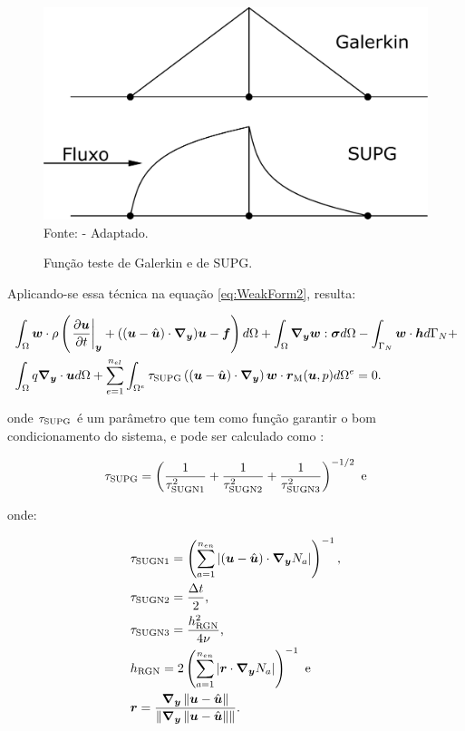 \begin{figure}[h!]
    \centering
    \caption{Função teste de Galerkin e de SUPG.}
    \includegraphics[width=.6\linewidth]{Figuras/SUPG.pdf}
    \\Fonte:  - Adaptado.
    \label{fig:Supg}
\end{figure}

Aplicando-se essa técnica na equação \eqref{eq:WeakForm2}, resulta:

\begin{equation}
    \begin{split}
        &\int_{\Omega}{\boldsymbol{w}\cdot\rho\left({\left.\frac{\partial \boldsymbol{u}}{\partial t}\right|_{\boldsymbol{y}}+((\boldsymbol{u}-\hat{\boldsymbol{u}})\cdot\boldsymbol{\nabla_y})\boldsymbol{u}-\boldsymbol{f}}\right) d\Omega}+\int_{\Omega}{\boldsymbol{\nabla_y}\boldsymbol{w}:\boldsymbol{\sigma} d\Omega}-\int_{\Gamma_N}{\boldsymbol{w}\cdot\boldsymbol{h} d\Gamma_N}+\\
        &\int_{\Omega}{q\boldsymbol{\nabla_y}\cdot\boldsymbol{u} d\Omega}+\sum_{e=1}^{n_{el}}{\int_{\Omega^e}{\tau_{\mathrm{SUPG}}\left({(\boldsymbol{u}-\hat{\boldsymbol{u}})\cdot\boldsymbol{\nabla_y}}\right)\boldsymbol{w}\cdot\boldsymbol{r}_\mathrm{M}(\boldsymbol{u},p) d\Omega^e}}=0\text{.}
    \end{split}
\end{equation}

\noindent onde $\tau_{\mathrm{SUPG}}$ é um parâmetro que tem como função garantir o bom condicionamento do sistema, e pode ser calculado como \cite{bazilevs2013computational}:

\begin{equation}
    \tau_{\mathrm{SUPG}}=\left({\frac{1}{\tau_{\mathrm{SUGN} 1}^2}+\frac{1}{\tau_{\mathrm{SUGN} 2}^2}+\frac{1}{\tau_{\mathrm{SUGN} 3}^2}}\right)^{-1/2}\text{ e}
    \label{eq:tauSUPG2}
\end{equation}

\noindent onde:

\begin{subequations}
    \begin{align}
         & \tau_{\mathrm{SUGN} 1}=\left({\sum_{a=1}^{n_{en}}{\left|{(\boldsymbol{u}-\hat{\boldsymbol{u}})\cdot\boldsymbol{\nabla_y} N_a}\right|}}\right)^{-1}\text{,} \\
         & \tau_{\mathrm{SUGN} 2}=\frac{\Delta t}{2}\text{,}                                                    \\
         & \tau_{\mathrm{SUGN} 3}=\frac{h_{\mathrm{RGN}}^2}{4\nu}\text{,}                                               \\
         & h_{\mathrm{RGN}}=2\left({\sum_{a=1}^{n_{en}}{\left|{\boldsymbol{r}\cdot\boldsymbol{\nabla_y} N_a}\right|}}\right)^{-1}\text{ e}                 \\
         & \boldsymbol{r}=\frac{\boldsymbol{\nabla_y}\left\lVert{\boldsymbol{u}-\hat{\boldsymbol{u}}}\right\lVert}{\left\lVert{\boldsymbol{\nabla_y}\left\lVert{\boldsymbol{u}-\hat{\boldsymbol{u}}}\right\lVert}\right\lVert}\text{.}
    \end{align}
\end{subequations}

